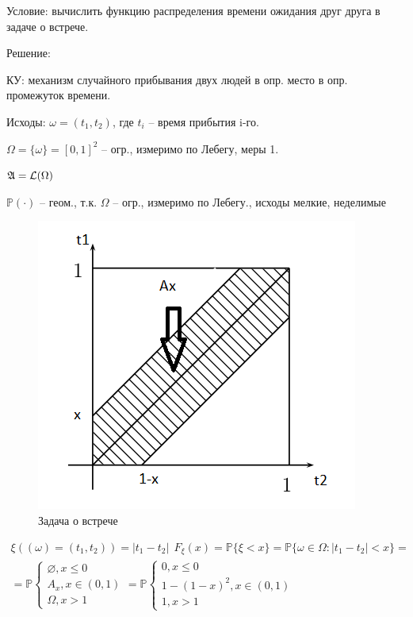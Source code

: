 \begin{zad}
	Условие: вычислить функцию распределения времени ожидания друг друга в задаче о встрече.

	Решение:

	КУ: механизм случайного прибывания двух людей в опр. место в опр. промежуток времени.

	Исходы: $\omega = (t_1,t_2)$, где $t_i$ -- время прибытия i-го.

	$\Omega = \{\omega\} = [0,1]^{2}$ -- огр., измеримо по Лебегу, меры 1.

	$\mathfrak{A} = \mathcal{L}(\Omega)$

	$\mathbb{P}(\cdot)$ -- геом., т.к. $\Omega$ -- огр., измеримо по Лебегу., исходы мелкие, неделимые

	\begin{figure}[H]
		\centering
		\includegraphics[width=0.5\linewidth]{img/vstr1.png}
		\caption{Задача о встрече}
	\end{figure}

	\begin{gather*}
		\xi((\omega)=(t_1,t_2)) = |t_1 - t_2| \ \ F_{\xi}(x) = \mathbb{P} \{ \xi < x \} = \mathbb{P} \{ \omega \in \Omega : |t_1 - t_2| < x \} = \\
		= \mathbb{P} \left\{\begin{array}{l} \varnothing , x \leq 0 \\ A_x, x \in (0,1)\\ \Omega, x > 1\end{array}\right. =\mathbb{P} \left\{\begin{array}{l} 0 , x \leq 0 \\ 1-(1-x)^2, x \in (0,1)\\ 1, x > 1 \end{array}\right.
	\end{gather*}
\end{zad}

